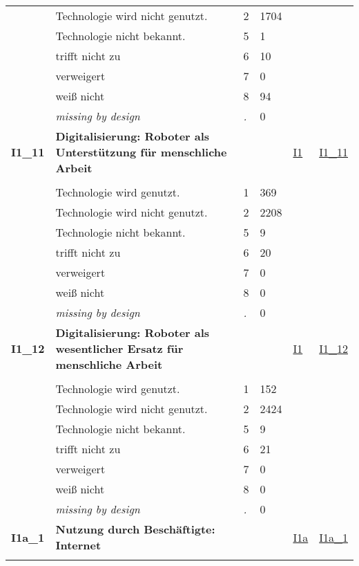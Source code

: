 \begin{longtable}{| L{2.45cm} | L{6cm} | C{1.5cm} | R{1cm} | C{2.25cm} | C{2.25cm} |}
   & Technologie wird nicht genutzt. & 2 & 1704 &  &  \\ 
   & Technologie nicht bekannt. & 5 & 1 &  &  \\ 
   & trifft nicht zu & 6 & 10 &  &  \\ 
   & verweigert & 7 & 0 &  &  \\ 
   & weiß nicht & 8 & 94 &  &  \\ 
   & \textit{missing by design} & \textit{.} & 0 &  &  \\ 
   \midrule
\textbf{I1\_11}\label{var:I1:11} & \textbf{Digitalisierung: Roboter als Unterstützung für menschliche Arbeit} &  &  & \hyperref[I1]{I1} & \hyperref[var:suf:I1:11]{I1\_11} \\ 
   &  &  &  &  &  \\ 
   & Technologie wird genutzt. & 1 & 369 &  &  \\ 
   & Technologie wird nicht genutzt. & 2 & 2208 &  &  \\ 
   & Technologie nicht bekannt. & 5 & 9 &  &  \\ 
   & trifft nicht zu & 6 & 20 &  &  \\ 
   & verweigert & 7 & 0 &  &  \\ 
   & weiß nicht & 8 & 0 &  &  \\ 
   & \textit{missing by design} & \textit{.} & 0 &  &  \\ 
   \midrule
\textbf{I1\_12}\label{var:I1:12} & \textbf{Digitalisierung: Roboter als wesentlicher Ersatz für menschliche Arbeit} &  &  & \hyperref[I1]{I1} & \hyperref[var:suf:I1:12]{I1\_12} \\ 
   &  &  &  &  &  \\ 
   & Technologie wird genutzt. & 1 & 152 &  &  \\ 
   & Technologie wird nicht genutzt. & 2 & 2424 &  &  \\ 
   & Technologie nicht bekannt. & 5 & 9 &  &  \\ 
   & trifft nicht zu & 6 & 21 &  &  \\ 
   & verweigert & 7 & 0 &  &  \\ 
   & weiß nicht & 8 & 0 &  &  \\ 
   & \textit{missing by design} & \textit{.} & 0 &  &  \\ 
   \midrule
\textbf{I1a\_1}\label{var:I1a:1} & \textbf{Nutzung durch Beschäftigte: Internet} &  &  & \hyperref[I1a]{I1a} & \hyperref[var:suf:I1a:1]{I1a\_1} \\ 
   &  &  &  &  &  \\ 

\end{longtable}
